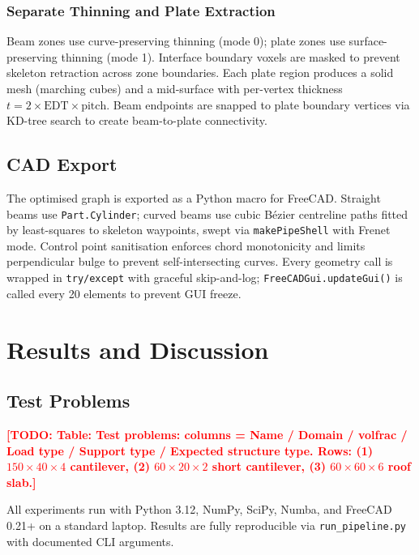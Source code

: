 \documentclass[11pt,a4paper]{article}
\newcommand{\TODO}[1]{\textcolor{red}{\textbf{[TODO: #1]}}}
\newcommand{\tblstub}[1]{\TODO{Table: #1}}
\begin{document}
\subsubsection{Separate Thinning and Plate Extraction}

Beam zones use curve-preserving thinning (mode 0); plate zones use
surface-preserving thinning (mode 1).
Interface boundary voxels are masked to prevent skeleton retraction across
zone boundaries.
Each plate region produces a solid mesh (marching cubes) and a mid-surface with
per-vertex thickness $t = 2 \times \text{EDT} \times \text{pitch}$.
Beam endpoints are snapped to plate boundary vertices via KD-tree search to
create beam-to-plate connectivity.

\subsection{CAD Export}
\label{subsec:cad}

The optimised graph is exported as a Python macro for FreeCAD.
Straight beams use \texttt{Part.Cylinder}; curved beams use cubic Bézier
centreline paths fitted by least-squares to skeleton waypoints, swept via
\texttt{makePipeShell} with Frenet mode.
Control point sanitisation enforces chord monotonicity and limits perpendicular
bulge to prevent self-intersecting curves.
Every geometry call is wrapped in \texttt{try/except} with graceful
skip-and-log; \texttt{FreeCADGui.updateGui()} is called every 20 elements to
prevent GUI freeze.

\section{Results and Discussion}
\label{sec:results}

\subsection{Test Problems}
\label{subsec:setup}

\tblstub{Test problems: columns = Name / Domain / volfrac / Load type / Support
  type / Expected structure type. Rows: (1) $150\times40\times4$ cantilever,
  (2) $60\times20\times2$ short cantilever, (3) $60\times60\times6$ roof slab.}

All experiments run with Python 3.12, NumPy, SciPy, Numba, and FreeCAD 0.21+
on a standard laptop.
Results are fully reproducible via \texttt{run\_pipeline.py} with documented
CLI arguments.
\end{document}
